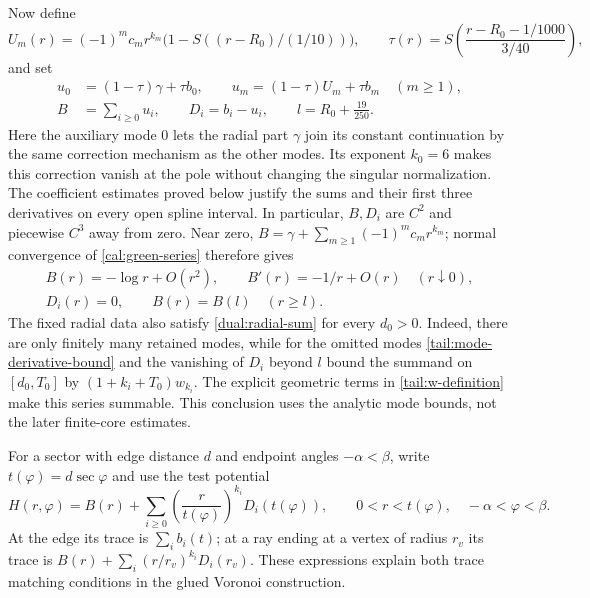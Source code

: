 Now define
\[
 U_m(r)=(-1)^mc_mr^{k_m}\bigl(1-S((r-R_0)/(1/10))\bigr),\qquad
 \tau(r)=S\left(\frac{r-R_0-1/1000}{3/40}\right),
\]
and set
\begin{equation}\label{cal:radial-data}
 \begin{split}
 u_0&=(1-\tau)\gamma+\tau b_0,\qquad
 u_m=(1-\tau)U_m+\tau b_m\quad(m\ge1),\\
 B&=\sum_{i\ge0}u_i,\qquad D_i=b_i-u_i,\qquad
 l=R_0+\frac{19}{250}.
 \end{split}
\end{equation}
Here the auxiliary mode $0$ lets the radial part $\gamma$ join its
constant continuation by the same correction mechanism as the other
modes.  Its exponent $k_0=6$ makes this correction vanish at the pole
without changing the singular normalization.  The coefficient
estimates proved below justify the sums and their
first three derivatives on every open spline interval.  In particular,
$B,D_i$ are $C^2$ and piecewise $C^3$ away from zero.  Near zero,
$B=\gamma+\sum_{m\ge1}(-1)^mc_mr^{k_m}$; normal convergence of
\eqref{cal:green-series} therefore gives
\begin{equation}\label{cal:radial-endpoints}
 \begin{gathered}
 B(r)=-\log r+O(r^2),\qquad B'(r)=-1/r+O(r)\quad(r\downarrow0),\\
 D_i(r)=0,\qquad B(r)=B(l)\quad(r\ge l).
 \end{gathered}
\end{equation}
The fixed radial data also satisfy \eqref{dual:radial-sum} for every
$d_0>0$.  Indeed, there are only finitely many retained modes, while
for the omitted modes \eqref{tail:mode-derivative-bound} and the
vanishing of $D_i$ beyond $l$ bound the summand on $[d_0,T_0]$ by
$(1+k_i+T_0)w_{k_i}$.  The explicit geometric terms in
\eqref{tail:w-definition} make this series summable.  This conclusion
uses the analytic mode bounds, not the later finite-core estimates.

For a sector with edge distance $d$ and endpoint angles $-\alpha<\beta$,
write $t(\varphi)=d\sec\varphi$ and use the test potential
\begin{equation}\label{cal:trial-potential}
 H(r,\varphi)=B(r)+\sum_{i\ge0}
                   \left(\frac r{t(\varphi)}\right)^{k_i}D_i(t(\varphi)),
 \qquad 0<r<t(\varphi),\quad -\alpha<\varphi<\beta.
\end{equation}
At the edge its trace is $\sum_i b_i(t)$; at a ray ending at a vertex of
radius $r_v$ its trace is $B(r)+\sum_i(r/r_v)^{k_i}D_i(r_v)$.
These expressions explain both trace matching conditions in the glued
Voronoi construction.

